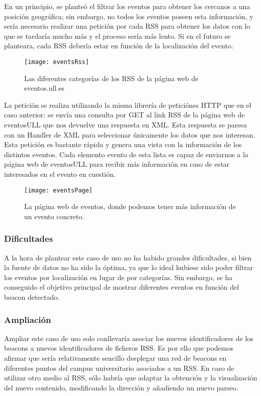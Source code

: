 En un principio, se planteó el filtrar los eventos para obtener los cercanos a una posición geográfica; sin embargo, no todos los eventos poseen esta información, y sería necesario realizar una petición por cada RSS para obtener los datos con lo que se tardaría mucho más y el proceso sería más lento. Si en el futuro se planteara, cada RSS debería estar en función de la localización del evento.

\begin{figure}[H]
	\centering
	\texttt{[image: eventsRss]}
	\caption{Las diferentes categorías de los RSS de la página web de eventos.ull.es}
	\label{fig:eventsRss}
\end{figure}


La petición se realiza utilizando la misma librería de peticiónes HTTP que en el caso anterior: se envía una consulta por GET al link RSS de la página web de eventosULL que nos devuelve una respuesta en XML. Esta respuesta se parsea con un Handler de XML para seleccionar únicamente los datos que nos interesan. Esta petición es bastante rápida y genera una vista con la información de los distintos eventos. Cada elemento evento de esta lista es capaz de enviarnos a la página web de eventosULL para recibir más información en caso de estar interesados en el evento en cuestión.

\begin{figure}[H]
	\centering
	\texttt{[image: eventsPage]}
	\caption{La página web de eventos, donde podemos tener más información de un evento concreto.}
	\label{fig:eventsPage}
\end{figure}

\subsubsection{Dificultades}


A la hora de plantear este caso de uso no ha habido grandes dificultades, si bien la fuente de datos no ha sido la óptima, ya que lo ideal hubiese sido poder filtrar los eventos por localización en lugar de por categorías. Sin embargo, se ha conseguido el objetivo principal de mostrar diferentes eventos en función del beacon detectado.

\subsubsection{Ampliación}


Ampliar este caso de uso solo conllevaría asociar los nuevos identificadores de los beacons a nuevos identificadores de ficheros RSS. Es por ello que podemos afirmar que sería relativamente sencillo desplegar una red de beacons en diferentes puntos del campus universitario asociados a un RSS. En caso de utilizar otro medio al RSS, sólo habría que adaptar la obtención y la visualización del nuevo contenido, modificando la dirección y añadiendo un nuevo parseo.


